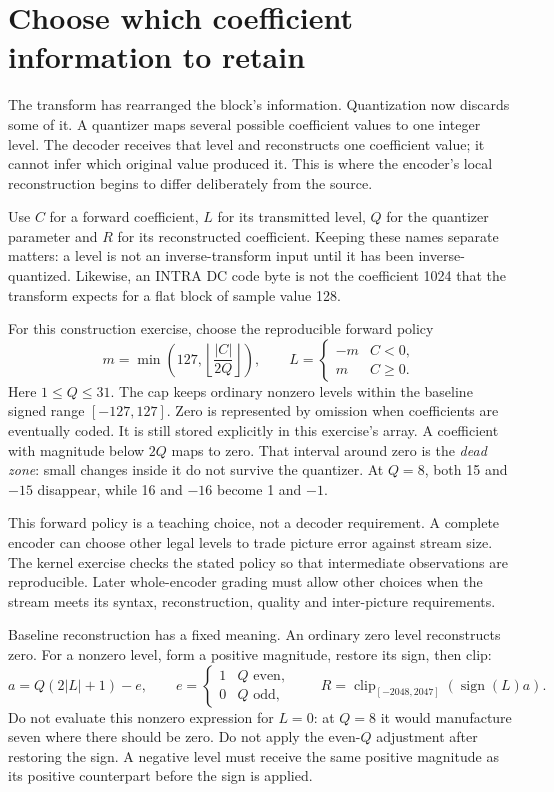 \section{Choose which coefficient information to retain}
The transform has rearranged the block's information. Quantization now discards
some of it. A quantizer maps several possible coefficient values to one integer
level. The decoder receives that level and reconstructs one coefficient value;
it cannot infer which original value produced it. This is where the encoder's
local reconstruction begins to differ deliberately from the source.

Use $C$ for a forward coefficient, $L$ for its transmitted level, $Q$ for the
quantizer parameter and $R$ for its reconstructed coefficient. Keeping these
names separate matters: a level is not an inverse-transform input until it has
been inverse-quantized. Likewise, an INTRA DC code byte is not the coefficient
1024 that the transform expects for a flat block of sample value 128.

For this construction exercise, choose the reproducible forward policy
\[
  m=\min\left(127,\left\lfloor\frac{|C|}{2Q}\right\rfloor\right),
  \qquad L=\begin{cases}-m&C<0,\\m&C\geq0.\end{cases}
\]
Here $1\leq Q\leq31$. The cap keeps ordinary nonzero levels within the baseline
signed range $[-127,127]$. Zero is represented by omission when coefficients
are eventually coded. It is still stored explicitly in this exercise's array.
A coefficient with magnitude below $2Q$ maps to zero. That interval around zero
is the \emph{dead zone}: small changes inside it do not survive the quantizer.
At $Q=8$, both 15 and $-15$ disappear, while 16 and $-16$ become 1 and $-1$.

This forward policy is a teaching choice, not a decoder requirement. A complete
encoder can choose other legal levels to trade picture error against stream size.
The kernel exercise checks the stated policy so that intermediate observations
are reproducible. Later whole-encoder grading must allow other choices when the
stream meets its syntax, reconstruction, quality and inter-picture requirements.

Baseline reconstruction has a fixed meaning. An ordinary zero level reconstructs
zero. For a nonzero level, form a positive magnitude, restore its sign, then clip:
\[
  a=Q(2|L|+1)-e,\qquad
  e=\begin{cases}1&Q\text{ even},\\0&Q\text{ odd},\end{cases}
  \qquad R=\operatorname{clip}_{[-2048,2047]}\!\left(\operatorname{sign}(L)a\right).
\]
Do not evaluate this nonzero expression for $L=0$: at $Q=8$ it would manufacture
seven where there should be zero. Do not apply the even-$Q$ adjustment after
restoring the sign. A negative level must receive the same positive magnitude
as its positive counterpart before the sign is applied.


